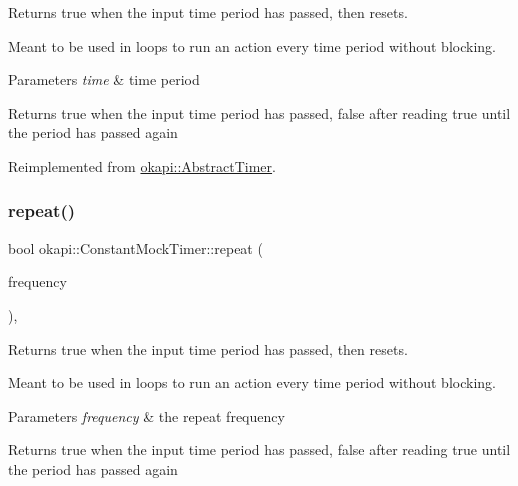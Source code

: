 Returns true when the input time period has passed, then resets. 

Meant to be used in loops to run an action every time period without blocking.


\begin{DoxyParams}{Parameters}
{\em time} & time period \\
\hline
\end{DoxyParams}
\begin{DoxyReturn}{Returns}
true when the input time period has passed, false after reading true until the period has passed again 
\end{DoxyReturn}


Reimplemented from \mbox{\hyperlink{classokapi_1_1AbstractTimer_a452be1d251e938ab4c69801ea2d52e20}{okapi\+::\+Abstract\+Timer}}.

\mbox{\label{classokapi_1_1ConstantMockTimer_acf41646c45b5704842f87e72f0dad9a3}} 
\subsubsection{\texorpdfstring{repeat()}{repeat()}\hspace{0.1cm}{\footnotesize\ttfamily [2/2]}}
{\footnotesize\ttfamily bool okapi\+::\+Constant\+Mock\+Timer\+::repeat (\begin{DoxyParamCaption}\item[{Q\+Frequency}]{frequency }\end{DoxyParamCaption})\hspace{0.3cm}{\ttfamily [override]}, {\ttfamily [virtual]}}



Returns true when the input time period has passed, then resets. 

Meant to be used in loops to run an action every time period without blocking.


\begin{DoxyParams}{Parameters}
{\em frequency} & the repeat frequency \\
\hline
\end{DoxyParams}
\begin{DoxyReturn}{Returns}
true when the input time period has passed, false after reading true until the period has passed again 
\end{DoxyReturn}


